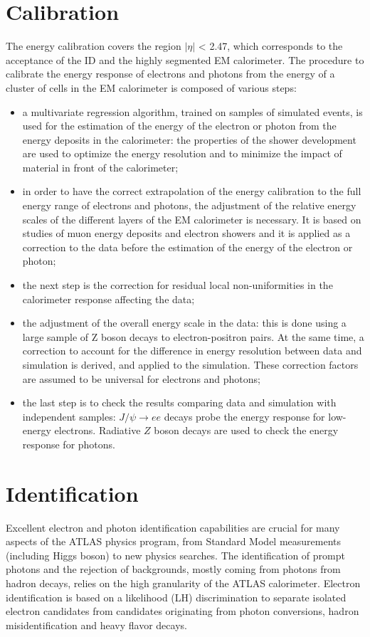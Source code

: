 \documentclass[a4paper, oneside, 11pt, openright]{book}
\begin{document}
		\section{Calibration}\label{section:Calib}
			The energy calibration covers the region $|\eta|$ < 2.47, which corresponds to the acceptance of the ID and the highly segmented EM calorimeter. The procedure to calibrate the energy response of electrons and photons from the energy of a cluster of cells in the EM calorimeter is composed of various steps:
			\begin{itemize}
				\item a multivariate regression algorithm, trained on samples of simulated events, is used for the estimation of the energy of the electron or photon from the energy deposits in the calorimeter: the properties of the shower development are used to optimize the energy resolution and to minimize the impact of material in front of the calorimeter;
				\item in order to have the correct extrapolation of the energy calibration to the full energy range
				of electrons and photons, the adjustment of the relative energy scales of the different layers of the EM calorimeter  is necessary. It is based on studies of muon energy deposits and electron showers and it is applied as a correction to the data before the estimation of the energy of the electron or photon;
				\item the next step is the correction for residual local non-uniformities in the calorimeter response affecting the
				data;
				\item the adjustment of the overall energy scale in the data: this is done using a large sample of
				Z boson decays to electron-positron pairs. At the same time, a correction to account for the
				difference in energy resolution between data and simulation is derived, and applied to the
				simulation. These correction factors are assumed to be universal for electrons and photons;
				\item the last step is to check the results comparing data and simulation with independent samples: $J/\psi \rightarrow ee$
				decays probe the energy response for low-energy electrons. Radiative $Z$ boson decays are used to check the energy response for photons.	
			\end{itemize}
		
		
		
		
		\section{Identification}\label{section:Ident}
		Excellent electron and photon identification capabilities \cite{Identification}\cite{Ident 2} are crucial for many aspects of the ATLAS physics program, from Standard Model measurements (including Higgs boson) to new physics searches. The identification of prompt photons and the rejection of backgrounds, mostly coming from photons from hadron decays, relies on the high granularity of the ATLAS calorimeter. Electron identification is based on a likelihood (LH) discrimination to separate isolated electron candidates from candidates originating from photon conversions, hadron misidentification and heavy flavor decays. 
\end{document}
